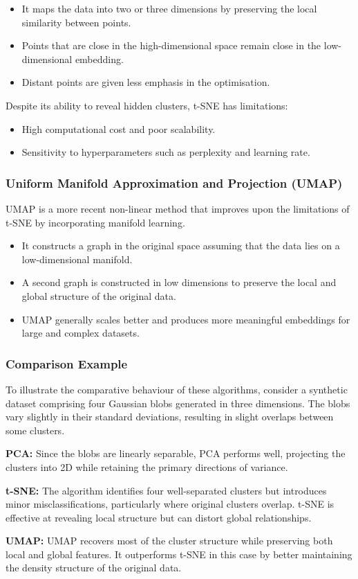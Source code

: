 \documentclass[9pt]{extarticle}
\begin{document}
\begin{itemize}
    \item It maps the data into two or three dimensions by preserving the local similarity between points.
    \item Points that are close in the high-dimensional space remain close in the low-dimensional embedding.
    \item Distant points are given less emphasis in the optimisation.
\end{itemize}

Despite its ability to reveal hidden clusters, t-SNE has limitations:
\begin{itemize}
    \item High computational cost and poor scalability.
    \item Sensitivity to hyperparameters such as perplexity and learning rate.
\end{itemize}

\subsubsection{Uniform Manifold Approximation and Projection (UMAP)}

UMAP is a more recent non-linear method that improves upon the limitations of t-SNE by incorporating manifold learning.

\begin{itemize}
    \item It constructs a graph in the original space assuming that the data lies on a low-dimensional manifold.
    \item A second graph is constructed in low dimensions to preserve the local and global structure of the original data.
    \item UMAP generally scales better and produces more meaningful embeddings for large and complex datasets.
\end{itemize}

\subsubsection{Comparison Example}

To illustrate the comparative behaviour of these algorithms, consider a synthetic dataset comprising four Gaussian blobs generated in three dimensions. The blobs vary slightly in their standard deviations, resulting in slight overlaps between some clusters.

\textbf{PCA:} Since the blobs are linearly separable, PCA performs well, projecting the clusters into 2D while retaining the primary directions of variance.

\textbf{t-SNE:} The algorithm identifies four well-separated clusters but introduces minor misclassifications, particularly where original clusters overlap. t-SNE is effective at revealing local structure but can distort global relationships.

\textbf{UMAP:} UMAP recovers most of the cluster structure while preserving both local and global features. It outperforms t-SNE in this case by better maintaining the density structure of the original data.
\end{document}
